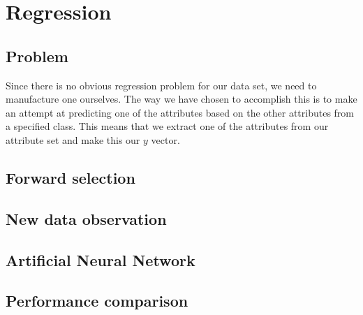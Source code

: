\chapter{Regression}

\section{Problem}
Since there is no obvious regression problem for our data set, we need to manufacture one ourselves. The way we have chosen to accomplish this is to make an attempt at predicting one of the attributes based on the other attributes from a specified class. This means that we extract one of the attributes from our attribute set and make this our $y$ vector.

\section{Forward selection}

\section{New data observation}


\section{Artificial Neural Network}


\section{Performance comparison}
